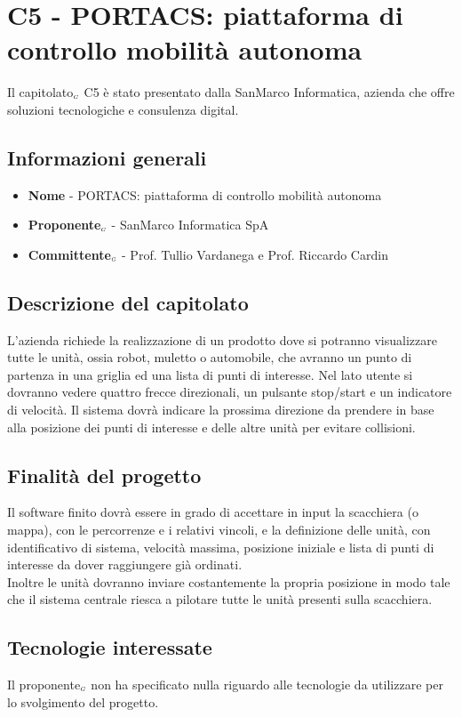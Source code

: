 \chapter{C5 - PORTACS: piattaforma di controllo mobilità autonoma} \label{CapitolatoC5}
Il capitolato$_{\scaleto{G}{3pt}}$ C5 è stato presentato dalla SanMarco Informatica, azienda che offre soluzioni tecnologiche e consulenza digital.
\section{Informazioni generali} \label{C5InformazioniGenerali}
\begin{itemize}
	\item \textbf{Nome} - PORTACS: piattaforma di controllo mobilità autonoma
	\item \textbf{Proponente}$_{\scaleto{G}{3pt}}$ - SanMarco Informatica SpA
	\item \textbf{Committente}$_{\scaleto{G}{3pt}}$ - Prof. Tullio Vardanega e Prof. Riccardo Cardin
\end{itemize}
\section{Descrizione del capitolato} \label{C5DescrizioneDelCapitolato}
L'azienda richiede la realizzazione di un prodotto dove si potranno visualizzare tutte le unità, ossia robot, muletto o automobile, che avranno un punto di partenza in una griglia ed una lista di punti di interesse. Nel lato utente si dovranno vedere quattro frecce direzionali, un pulsante stop/start e un indicatore di velocità. Il sistema dovrà indicare la prossima direzione da prendere in base alla posizione dei punti di interesse e delle altre unità per evitare collisioni.
\section{Finalità del progetto} \label{C5FinalitàDelProgetto}
Il software finito dovrà essere in grado di accettare in input la scacchiera (o mappa), con le percorrenze e i relativi vincoli, e la definizione delle unità, con identificativo di sistema, velocità massima, posizione iniziale e lista di punti di interesse da dover raggiungere già ordinati. \\
Inoltre le unità dovranno inviare costantemente la propria posizione in modo tale che il sistema centrale riesca a pilotare tutte le unità presenti sulla scacchiera.
\section{Tecnologie interessate} \label{C5TecnologieInteressate}
Il proponente$_{\scaleto{G}{3pt}}$ non ha specificato nulla riguardo alle tecnologie da utilizzare per lo svolgimento del progetto.

